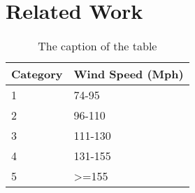 \section{Related Work}

\lipsum[1] 
\begin{table}[th!]
\centering
\begin{tabular}{@{}ll@{}}
\toprule
Category                & Wind	Speed (Mph)             \\ \midrule
\multicolumn{1}{|l|}{1} & \multicolumn{1}{l|}{74-95}   \\ \midrule
\multicolumn{1}{|l|}{2} & \multicolumn{1}{l|}{96-110}  \\ \midrule
\multicolumn{1}{|l|}{3} & \multicolumn{1}{l|}{111-130} \\ \midrule
\multicolumn{1}{|l|}{4} & \multicolumn{1}{l|}{131-155} \\ \midrule
5                       & \textgreater{}=155           \\ \bottomrule
\end{tabular}
 \caption{The caption of the table}\label{tab:somename}
\end{table}


\lipsum[2] 
